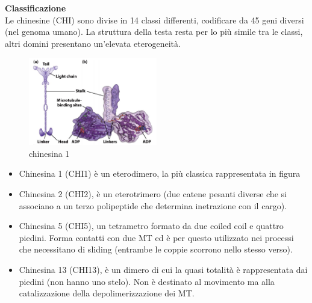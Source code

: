             \textbf{Classificazione}\\
                Le chinesine (CHI) sono divise in 14 classi differenti, codificare da 45 geni diversi (nel genoma umano). La struttura della testa resta per lo più simile tra le classi, altri domini presentano un'elevata eterogeneità.
                \begin{figure}[h]
                    \centering
                    \includegraphics[width=0.5\textwidth]{images/chinesina.JPG}
                    \caption{\small chinesina 1}
                    \label{fig:mesh1}
                \end{figure}
                \begin{itemize}
                    \item Chinesina 1 (CHI1) è un eterodimero, la più classica rappresentata in figura
                    \item Chinesina 2 (CHI2), è un eterotrimero (due catene pesanti diverse che si associano a un terzo polipeptide che determina inetrazione con il cargo).
                    \item Chinesina 5 (CHI5), un tetrametro formato da due coiled coil e quattro piedini. Forma contatti con due MT ed è per questo utilizzato nei processi che necessitano di sliding (entrambe le coppie scorrono nello stesso verso).
                    \item Chinesina 13 (CHI13), è un dimero di cui la quasi totalità è rappresentata dai piedini (non hanno uno stelo). Non è destinato al movimento ma alla catalizzazione della depolimerizzazione dei MT.
                \end{itemize}
                
